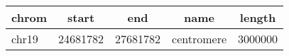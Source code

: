 \documentclass{standalone}
\begin{document}
\begin{tabular}{|l|c|c|c|c|}
\toprule
chrom & start & end & name & length \\
\midrule
chr19 & 24681782 & 27681782 & centromere & 3000000 \\
\bottomrule
\end{tabular}
\end{document}
